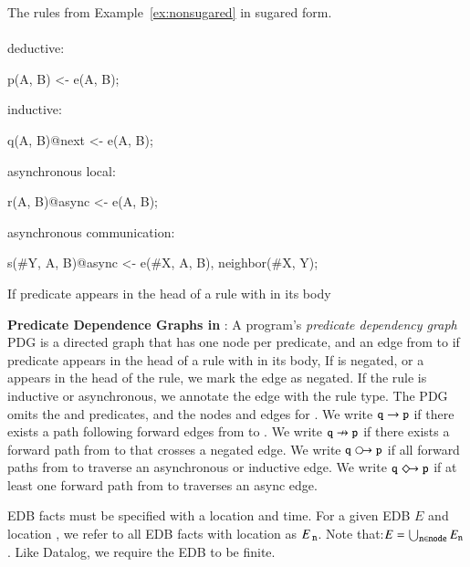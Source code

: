 \begin{example}
\label{ex:sugared}
The rules from Example~\ref{ex:nonsugared} in sugared form.
\\\\
deductive:\\
\begin{Dedalus}
p(A, B) <- e(A, B);
\end{Dedalus}
inductive:\\
\begin{Dedalus}
q(A, B)@next <- e(A, B);
\end{Dedalus}
asynchronous local:\\
\begin{Dedalus}
r(A, B)@async <- e(A, B);
\end{Dedalus}
asynchronous communication:\\
\begin{Dedalus}
s(#Y, A, B)@async <- e(#X, A, B), neighbor(#X, Y);
\end{Dedalus}
\end{example}

If predicate  appears in the head of a rule with  in its body 

\noindent
\textbf{Predicate Dependence Graphs in \lang}:
A \lang program's {\em predicate dependency graph}~\cite{ullmanbook} PDG is
a directed graph that has one node per predicate, and an edge from  to  if predicate  appears in the head of a rule with  in its body,  If  is negated, or a  appears in the head of the rule, we mark the edge as negated.  If the rule is inductive or asynchronous, we annotate the edge with the rule type.  The PDG omits the  and  predicates, and the nodes and edges for .  We write $\dedalus{q} \to \dedalus{p}$ if there exists a path following forward edges from  to .  We write $\dedalus{q} \nrightarrow \dedalus{p}$ if there exists a forward path from  to  that crosses a negated edge.  We write $\dedalus{q} \circleright \dedalus{p}$ if all forward paths from  to  traverse an asynchronous or inductive edge.  We write $\dedalus{q} \Diamondright \dedalus{p}$ if at least one forward path from  to  traverses an async edge.

\vspace{1em}
EDB facts must be specified with a location and time.  For a given EDB $E$ and location , we refer to all EDB facts with location  as $E_{\text{ \dedalus{{\scriptsize n}}}}$.  Note that:$E = \bigcup_{\text{\dedalus{{\scriptsize n}}} \in \text{\dedalus{{\scriptsize node}}}} E_{\text{\dedalus{{\scriptsize n}}}}$.  Like Datalog, we require the EDB to be finite.


